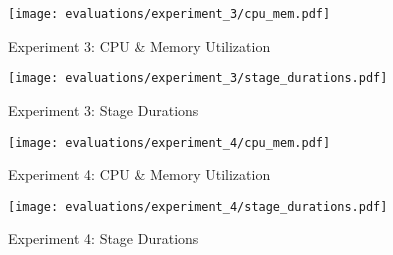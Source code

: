 \begin{figure}[H]
    \begin{adjustwidth}{-0.2\paperwidth}{-0.2\paperwidth}
        \centering
        \texttt{[image: evaluations/experiment\_3/cpu\_mem.pdf]}
        \caption{Experiment 3: CPU \& Memory Utilization}
        \label{fig:eval_3_cpu_and_mem}
    \end{adjustwidth}
\end{figure}

\begin{figure}[H]
    \begin{adjustwidth}{-0.2\paperwidth}{-0.2\paperwidth}
        \centering
        \texttt{[image: evaluations/experiment\_3/stage\_durations.pdf]}
        \caption{Experiment 3: Stage Durations}
        \label{fig:eval_3_simplest_stage_durations}
    \end{adjustwidth}
\end{figure}


\begin{figure}[H]
    \begin{adjustwidth}{-0.2\paperwidth}{-0.2\paperwidth}
        \centering
        \texttt{[image: evaluations/experiment\_4/cpu\_mem.pdf]}
        \caption{Experiment 4: CPU \& Memory Utilization}
        \label{fig:eval_4_cpu_and_mem}
    \end{adjustwidth}
\end{figure}

\begin{figure}[H]
    \begin{adjustwidth}{-0.2\paperwidth}{-0.2\paperwidth}
        \centering
        \texttt{[image: evaluations/experiment\_4/stage\_durations.pdf]}
        \caption{Experiment 4: Stage Durations}
        \label{fig:eval_4_simplest_stage_durations}
    \end{adjustwidth}
\end{figure}
